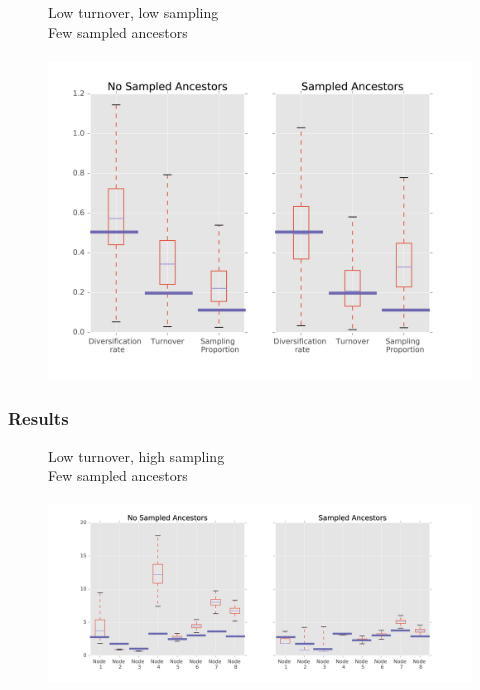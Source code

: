 \documentclass[]{beamer}
\begin{document}
\begin{frame}
\begin{center}
\begin{figure}
Low turnover, low sampling  \\
Few sampled ancestors \\
\lambda   \mu   \psi   \rho \\
\includegraphics[scale=0.4]{images/LowTurnLowSamplog.png}
\end{figure}
\end{center}
\end{frame}


\begin{frame}
\frametitle{Results}
\begin{center}
\begin{figure}
Low turnover, high sampling  \\
Few sampled ancestors \\
\lambda   \mu   \psi   \rho \\
\includegraphics[scale=0.4]{images/LowTurnHighSampnodes.png}
\end{figure}
\end{center}
\end{frame}
\end{document}
